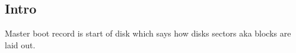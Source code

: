 
\subsection{Intro}

Master boot record is start of disk which says how disks sectors aka blocks are laid out.

